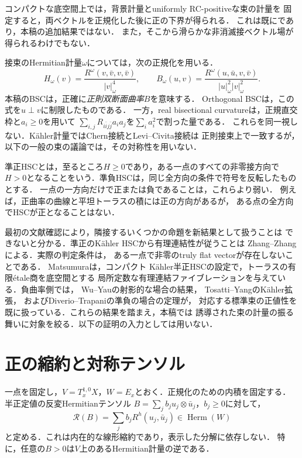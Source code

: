\documentclass[12pt]{amsart}
\theoremstyle{definition}
\theoremstyle{remark}
\numberwithin{equation}{section}
\theoremstyle{definition}
\begin{document}
コンパクトな底空間上では，背景計量とuniformly RC-positiveな束の計量を
固定すると，両ベクトルを正規化した後に正の下界が得られる．
これは既に\cite[Proposition 2.9]{ja:Yan20}であり，本稿の追加結果ではない．
また，そこから滑らかな非消滅接ベクトル場が得られるわけでもない．

接束のHermitian計量$\omega$については，次の正規化を用いる．
\begin{equation}\label{ja:hsc}
 H_\omega(v)=\frac{R^\omega(v,\bar v,v,\bar v)}{|v|_\omega^4},\qquad
 B_\omega(u,v)=\frac{R^\omega(u,\bar u,v,\bar v)}
 {|u|_\omega^2|v|_\omega^2}.
\end{equation}
本稿のBSCは，正確に\emph{正則双断面曲率}$B$を意味する．
Orthogonal BSCは，この式を$u\perp v$に制限したものである．
一方，real bisectional curvatureは，正規直交枠と$a_i\geq0$を用いて
$\sum_{i,j}R_{i\bar i j\bar j}a_i a_j$を$\sum_i a_i^2$で割った量である．
これらを同一視しない．K\"ahler計量ではChern接続とLevi--Civita接続は
正則接束上で一致するが，以下の一般の束の議論では，その対称性を用いない．

準正HSCとは，至るところ$H\geq0$であり，ある一点のすべての非零接方向で
$H>0$となることをいう．準負HSCは，同じ全方向の条件で符号を反転したものとする．
一点の一方向だけで正または負であることは，これらより弱い．
例えば，正曲率の曲線と平坦トーラスの積には正の方向があるが，
ある点の全方向でHSCが正となることはない．

最初の文献確認により，隣接するいくつかの命題を新結果として扱うことは
できないと分かる．準正のK\"ahler HSCから有理連結性が従うことは
Zhang--Zhang\cite[Theorem 1.5]{ja:ZZ}による．実際の判定条件は，
ある一点で非零のtruly flat vectorが存在しないことである．
Matsumura\cite[Theorem 1.1 and Remark 1.2]{ja:Mat}は，コンパクト
K\"ahler半正HSCの設定で，トーラスの有限\'etale商を底空間とする
局所定数な有理連結ファイブレーションを与えている．負曲率側では，
Wu--Yauの射影的な場合の結果\cite[Theorem 2]{ja:WY}，
Tosatti--YangのK\"ahler拡張\cite[Theorem 1.1 and Corollary 1.2]{ja:TY}，
およびDiverio--Trapaniの準負の場合の定理\cite[Theorem 1.2]{ja:DT}が，
対応する標準束の正値性を既に扱っている．これらの結果を踏まえ，本稿では
誘導された束の計量の振る舞いに対象を絞る．以下の証明の入力としては用いない．

\section{正の縮約と対称テンソル}
\label{ja:proofmain}

一点を固定し，$V=T_x^{1,0}X$，$W=E_x$とおく．正規化のための内積を固定する．
半正定値の反変Hermitianテンソル
$B=\sum_j b_j u_j\otimes\bar u_j$，$b_j\geq0$に対して，
\begin{equation}\label{ja:contraction}
 \mathcal R(B)=\sum_j b_jR^h(u_j,\bar u_j)\in\operatorname{Herm}(W)
\end{equation}
と定める．これは内在的な線形縮約であり，表示した分解に依存しない．
特に，任意の$B>0$は$V$上のあるHermitian計量の逆である．
\end{document}
